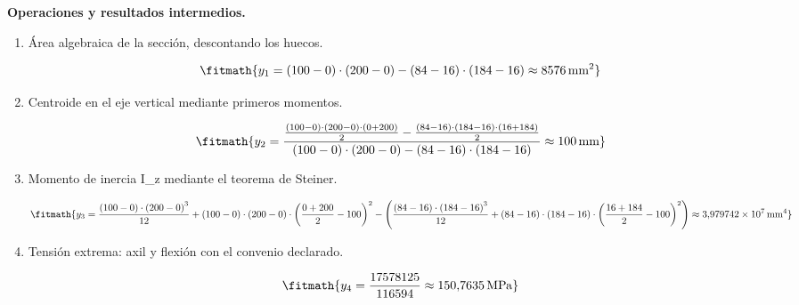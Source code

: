 \noindent\textbf{Operaciones y resultados intermedios.}

\begin{enumerate}

\item Área algebraica de la sección, descontando los huecos.

\[\fitmath{y_{1}=\left(100-0\right)\cdot \left(200-0\right)-\left(84-16\right)\cdot \left(184-16\right)\approx 8576\,\mathrm{mm^{2}}}\]

\item Centroide en el eje vertical mediante primeros momentos.

\[\fitmath{y_{2}=\frac{\frac{\left(100-0\right)\cdot \left(200-0\right)\cdot \left(0+200\right)}{2}-\frac{\left(84-16\right)\cdot \left(184-16\right)\cdot \left(16+184\right)}{2}}{\left(100-0\right)\cdot \left(200-0\right)-\left(84-16\right)\cdot \left(184-16\right)}\approx 100\,\mathrm{mm}}\]

\item Momento de inercia I\_z mediante el teorema de Steiner.

\[\fitmath{y_{3}=\frac{\left(100-0\right)\cdot {\left(200-0\right)}^{3}}{12}+\left(100-0\right)\cdot \left(200-0\right)\cdot {\left(\frac{0+200}{2}-100\right)}^{2}-\left(\frac{\left(84-16\right)\cdot {\left(184-16\right)}^{3}}{12}+\left(84-16\right)\cdot \left(184-16\right)\cdot {\left(\frac{16+184}{2}-100\right)}^{2}\right)\approx 3{,}979742\times10^{7}\,\mathrm{mm^{4}}}\]

\item Tensión extrema: axil y flexión con el convenio declarado.

\[\fitmath{y_{4}=\frac{17578125}{116594}\approx 150{,}7635\,\mathrm{MPa}}\]

\end{enumerate}
